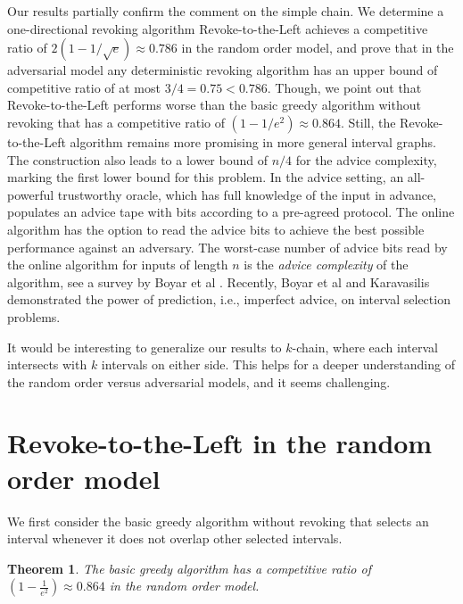 \documentclass[reqno,11pt]{article} %
\newtheorem{theorem}{Theorem}
\theoremstyle{remark}
\begin{document}
Our results partially confirm the comment on the simple chain. We determine a one-directional revoking algorithm Revoke-to-the-Left achieves a competitive ratio of $2(1 - 1/\sqrt{e}) \approx 0.786$ in the random order model, and prove that in the adversarial model any deterministic revoking algorithm has an upper bound of competitive ratio of at most $3/4=0.75 < 0.786$. Though, we point out that Revoke-to-the-Left performs worse than  the basic greedy algorithm without revoking that has a competitive ratio of $(1 - 1/e^2) \approx 0.864$. Still,  the Revoke-to-the-Left algorithm remains more promising in more general interval graphs. The construction also leads to a lower bound of  $n/4$ for the advice complexity,  marking the first lower bound for this problem.  In the advice setting, an all-powerful trustworthy oracle, which has full knowledge of the input in advance, populates an advice tape with bits according to a pre-agreed protocol. The online algorithm has the option to read the advice bits to achieve the best possible performance against an adversary. The worst-case number of advice bits read by the online algorithm for inputs of length $n$ is the \emph{advice complexity} of the algorithm, see   a survey by Boyar et al \cite{boyar2016online_advice_survey}. Recently, Boyar et al \cite{boyar2023onlineinterval_predictions} and Karavasilis \cite{karavasilis2025interval_prediction} demonstrated the power of prediction, i.e., imperfect advice, on interval selection problems.

It would be interesting to generalize our results to $k$-chain, where each interval intersects with $k$ intervals on either side. This helps for a deeper understanding of the random order versus adversarial models, and it seems challenging. 










\section{Revoke-to-the-Left in the random order model}

We first consider the basic greedy algorithm without revoking that selects an interval whenever it does not overlap other selected intervals. 


\begin{theorem}
	The basic greedy algorithm has a competitive ratio of $(1-\frac{1}{e^2}) \approx 0.864$ in the random order model.
\end{theorem}
\end{document}
